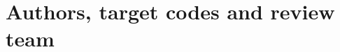 


\renewcommand{\longname}{IO }
\renewcommand{\funcname}{ IO }
\renewcommand{\shortname}{IO}
\renewcommand{\myauthors}{Leonid Zaslavsky, Arlindo da Silva, Michael
Young, 
Mark Iredell}

\setcounter{section}{0}
\renewcommand{\thesection}{\arabic{section}}
\renewcommand{\thesubsection}{\arabic{section}.\arabic{subsection}}
\renewcommand{\thesubsubsection}{\arabic{section}.\arabic{subsection}.\arabic{subsubsection}}

%


%


\section{Authors, target codes and review team}


